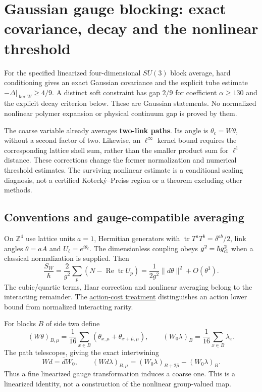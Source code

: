 \documentclass[11pt,a4paper]{article}
\begin{document}
\hypertarget{gaussian-gauge-blocking-exact-covariance-decay-and-the-nonlinear-threshold}{%
\section{Gaussian gauge blocking: exact covariance, decay and the
nonlinear
threshold}\label{gaussian-gauge-blocking-exact-covariance-decay-and-the-nonlinear-threshold}}

For the specified linearized four-dimensional \(SU(3)\) block average,
hard conditioning gives an exact Gaussian covariance and the explicit
tube estimate \(-\Delta|_{\ker W}\ge4/9\). A distinct soft constraint
has gap \(2/9\) for coefficient \(\alpha\ge130\) and the explicit decay
criterion below. These are Gaussian statements. No normalized nonlinear
polymer expansion or physical continuum gap is proved by them.

The coarse variable already averages \textbf{two-link paths}. Its angle
is \(\theta_c=W\theta\), without a second factor of two. Likewise, an
\(\ell^\infty\) kernel bound requires the corresponding lattice shell
sum, rather than the smaller product sum for \(\ell^1\) distance. These
corrections change the former normalization and numerical threshold
estimates. The surviving nonlinear estimate is a conditional scaling
diagnosis, not a certified Kotecký--Preiss region or a theorem excluding
other methods.

\hypertarget{conventions-and-gauge-compatible-averaging}{%
\subsection{Conventions and gauge-compatible
averaging}\label{conventions-and-gauge-compatible-averaging}}

On \(\mathbb Z^4\) use lattice units \(a=1\), Hermitian generators with
\(\operatorname{tr}T^aT^b=\delta^{ab}/2\), link angles \(\theta=aA\) and
\(U_\ell=e^{i\theta_\ell}\). The dimensionless coupling obeys
\(g^2=\hbar g_{\rm cl}^2\) when a classical normalization is supplied.
Then
\[\frac{S_W}{\hbar}=\frac2{g^2}\sum_p(N-\operatorname{Re}\operatorname{tr}U_p)
=\frac1{2g^2}\|d\theta\|^2+O(\theta^3).\] The cubic/quartic terms, Haar
correction and nonlinear averaging belong to the interacting remainder.
The \href{large-field-action-lower-bound.md}{action-cost treatment}
distinguishes an action lower bound from normalized interacting rarity.

For blocks \(B\) of side two define
\[(W\theta)_{B,\mu}=\frac1{16}\sum_{x\in B}
 (\theta_{x,\mu}+\theta_{x+\hat\mu,\mu}),\qquad
 (W_0\lambda)_B=\frac1{16}\sum_{x\in B}\lambda_x.\] The path telescopes,
giving the exact intertwining \[Wd=\bar dW_0,\qquad
 (Wd\lambda)_{B,\mu}=(W_0\lambda)_{B+2\hat\mu}-(W_0\lambda)_B.\] Thus a
fine linearized gauge transformation induces a coarse one. This is a
linearized identity, not a construction of the nonlinear group-valued
map.
\end{document}

